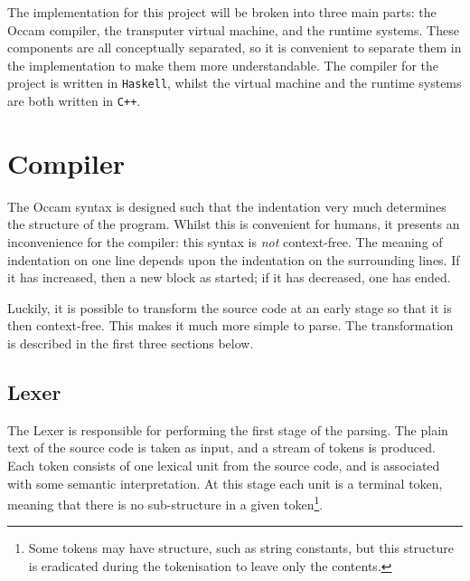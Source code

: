 The implementation for this project will be broken into three main parts: the
Occam compiler, the \gls{transputer} virtual machine, and the runtime systems.
These components are all conceptually separated, so it is convenient to separate
them in the implementation to make them more understandable. The compiler for
the project is written in \texttt{Haskell}, whilst the virtual machine and the
runtime systems are both written in \texttt{C++}.

\section{Compiler}

The Occam syntax is designed such that the indentation very much determines the
structure of the program. Whilst this is convenient for humans, it presents an
inconvenience for the compiler: this syntax is \textit{not} context-free. The
meaning of indentation on one line depends upon the indentation on the
surrounding lines. If it has increased, then a new block as started; if it has
decreased, one has ended.

Luckily, it is possible to transform the source code at an early stage so that
it is then context-free. This makes it much more simple to parse. The
transformation is described in the first three sections below.

\subsection{Lexer} \label{design-lexer}

The Lexer is responsible for performing the first stage of the parsing. The
plain text of the source code is taken as input, and a stream of tokens is
produced. Each token consists of one lexical unit from the source code, and is
associated with some semantic interpretation. At this stage each unit is
a terminal token, meaning that there is no sub-structure in a given
token\footnote{Some tokens may have structure, such as string constants, but
this structure is eradicated during the tokenisation to leave only the
contents.}.

